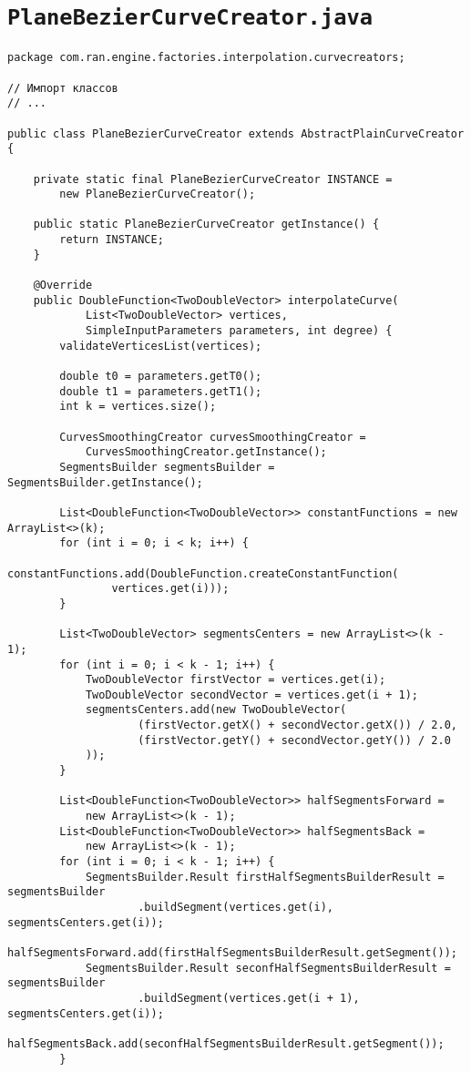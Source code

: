 \section*{\texttt{PlaneBezierCurveCreator.java}}
\begin{verbatim}
package com.ran.engine.factories.interpolation.curvecreators;

// Импорт классов
// ...

public class PlaneBezierCurveCreator extends AbstractPlainCurveCreator {

    private static final PlaneBezierCurveCreator INSTANCE =
        new PlaneBezierCurveCreator();

    public static PlaneBezierCurveCreator getInstance() {
        return INSTANCE;
    }

    @Override
    public DoubleFunction<TwoDoubleVector> interpolateCurve(
            List<TwoDoubleVector> vertices,
            SimpleInputParameters parameters, int degree) {
        validateVerticesList(vertices);

        double t0 = parameters.getT0();
        double t1 = parameters.getT1();
        int k = vertices.size();

        CurvesSmoothingCreator curvesSmoothingCreator =
            CurvesSmoothingCreator.getInstance();
        SegmentsBuilder segmentsBuilder = SegmentsBuilder.getInstance();

        List<DoubleFunction<TwoDoubleVector>> constantFunctions = new ArrayList<>(k);
        for (int i = 0; i < k; i++) {
            constantFunctions.add(DoubleFunction.createConstantFunction(
                vertices.get(i)));
        }

        List<TwoDoubleVector> segmentsCenters = new ArrayList<>(k - 1);
        for (int i = 0; i < k - 1; i++) {
            TwoDoubleVector firstVector = vertices.get(i);
            TwoDoubleVector secondVector = vertices.get(i + 1);
            segmentsCenters.add(new TwoDoubleVector(
                    (firstVector.getX() + secondVector.getX()) / 2.0,
                    (firstVector.getY() + secondVector.getY()) / 2.0
            ));
        }

        List<DoubleFunction<TwoDoubleVector>> halfSegmentsForward =
            new ArrayList<>(k - 1);
        List<DoubleFunction<TwoDoubleVector>> halfSegmentsBack =
            new ArrayList<>(k - 1);
        for (int i = 0; i < k - 1; i++) {
            SegmentsBuilder.Result firstHalfSegmentsBuilderResult = segmentsBuilder
                    .buildSegment(vertices.get(i), segmentsCenters.get(i));
            halfSegmentsForward.add(firstHalfSegmentsBuilderResult.getSegment());
            SegmentsBuilder.Result seconfHalfSegmentsBuilderResult = segmentsBuilder
                    .buildSegment(vertices.get(i + 1), segmentsCenters.get(i));
            halfSegmentsBack.add(seconfHalfSegmentsBuilderResult.getSegment());
        }


\end{verbatim}
